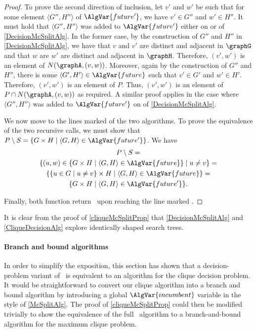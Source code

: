 \begin{proof}
    To prove the second direction of inclusion, let $v'$ and $w'$ be such that for
    some element $\langle G'',H'' \rangle$ of $\AlgVar{future'}$, we have
    $v' \in G''$ and $w' \in H''$.  It must hold that 
    $\langle G'',H'' \rangle$ was added to $\AlgVar{future'}$ either on
     or  of
    \cref{DecisionMcSplitAlg}. In the former case, by the construction of $G''$ and $H''$
    in \cref{DecisionMcSplitAlg}, we have that $v$ and $v'$ are distinct and adjacent
    in $\graphG$ and that $w$ are $w'$ are distinct and adjacent in $\graphH$.
    Therefore, $(v',w')$ is an element
    of $N(\graphA, (v,w))$.
    Moreover, again by the construction of $G''$ and $H''$,
    there is some $\langle G',H' \rangle \in \AlgVar{future}$ such that
    $v' \in G'$ and $w' \in H'$.
    Therefore, $(v',w')$ is an element of $P$.
    Thus, $(v',w')$ is an element of $P \cap N(\graphA, (v,w))$ as required.
    A similar proof applies in the case where
    $\langle G'',H'' \rangle$ was added to $\AlgVar{future'}$ on
     of \cref{DecisionMcSplitAlg}.

    We now move to the lines marked  of the two algorithms. 
    To prove the equivalence of the two recursive calls, we must show that
    $P \setminus S = \{G \times H \mid \langle G,H \rangle \in \AlgVar{future'}\}$. We have
\begin{gather}
    P \setminus S = \\
    \{(u,w) \in \{G \times H \mid \langle G,H \rangle \in \AlgVar{future}\} \mid u \not= v\} = \\
    \{\{u \in G \mid u \not= v\} \times H \mid \langle G,H \rangle \in \AlgVar{future}\} = \\
    \{G \times H \mid \langle G,H \rangle \in \AlgVar{future'}\}.
\end{gather}

    Finally, both function return \boolF\ upon reaching the line marked .
\end{proof}

It is clear from the proof of \cref{cliqueMcSplitProp} that \cref{DecisionMcSplitAlg}
and \cref{CliqueDecisionAlg} explore identically shaped search trees.

\paragraph{Branch and bound algorithms}
In order to simplify the exposition, this section has shown that a
decision-problem variant of \McSplit\ is equivalent to an algorithm
for the clique decision problem.  It would be straightforward to convert our clique
algorithm into a branch and bound algorithm by introducing a global $\AlgVar{incumbent}$
variable in the style of \cref{McSplitAlg}.  The proof of \cref{cliqueMcSplitProp} could
then be modified trivially to show the equivalence of the full \McSplit\ algorithm to
a branch-and-bound algorithm for the maximum clique problem.

